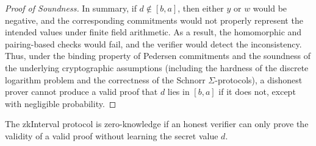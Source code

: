 \documentclass[version=preprint]{iacrcc}
\begin{document}
\begin{proof}[Proof of Soundness]
  In summary, if \( d \notin [b, a] \), then either \( y \) or \( w \) would be negative, and the corresponding commitments would not properly represent the intended values under finite field arithmetic. As a result, the homomorphic and pairing-based checks would fail, and the verifier would detect the inconsistency. Thus, under the binding property of Pedersen commitments and the soundness of the underlying cryptographic assumptions (including the hardness of the discrete logarithm problem and the correctness of the Schnorr \(\Sigma\)-protocols), a dishonest prover cannot produce a valid proof that \( d \) lies in \([b, a]\) if it does not, except with negligible probability.
\end{proof}

The zkInterval protocol is zero-knowledge if an honest verifier can only prove the validity of a valid proof without learning the secret value \(d\).
\end{document}

